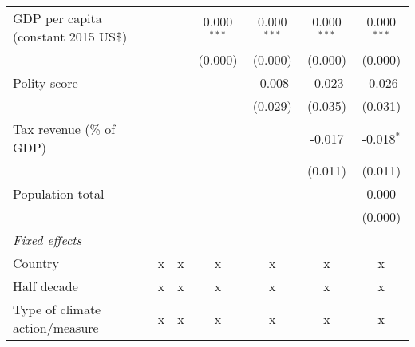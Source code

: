 \begin{tabular}{lcccccc}
   GDP per capita (constant 2015 US\$)                                                             &         &                & 0.000$^{***}$  & 0.000$^{***}$  & 0.000$^{***}$  & 0.000$^{***}$\\   
                                                                                                   &         &                & (0.000)        & (0.000)        & (0.000)        & (0.000)\\   
   Polity score                                                                                    &         &                &                & -0.008         & -0.023         & -0.026\\   
                                                                                                   &         &                &                & (0.029)        & (0.035)        & (0.031)\\   
   Tax revenue (\% of GDP)                                                                         &         &                &                &                & -0.017         & -0.018$^{*}$\\   
                                                                                                   &         &                &                &                & (0.011)        & (0.011)\\   
   Population total                                                                                &         &                &                &                &                & 0.000\\   
                                                                                                   &         &                &                &                &                & (0.000)\\   
   \emph{Fixed effects}\\
   Country                                                                                         & x       & x              & x              & x              & x              & x\\  
   Half decade                                                                                     & x       & x              & x              & x              & x              & x\\  
   Type of climate action/measure                                                                  & x       & x              & x              & x              & x              & x\\  

\end{tabular}
